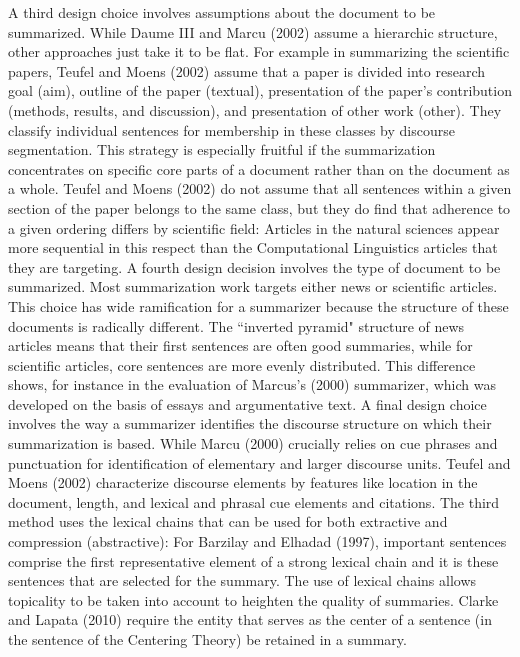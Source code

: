 A third design choice involves assumptions about the document to be summarized.
While  Daume III and Marcu (2002) assume a hierarchic structure, other approaches just take it to be flat. 
For example in summarizing the scientific papers, Teufel and Moens (2002) assume that a paper is divided into research goal (aim), outline of the paper (textual), presentation of the paper's contribution (methods, results, and discussion), and presentation of other work (other). 
They classify individual sentences for membership in these classes by discourse segmentation. 
This strategy is especially fruitful if the summarization concentrates on specific core parts of a document rather than on the document as a whole. 
Teufel and Moens (2002) do not assume that all sentences within a given section of the paper belongs to the same class, but they do find that adherence to a given ordering differs by scientific field: Articles in the natural sciences appear more sequential in this respect than the Computational Linguistics articles that they are targeting. 
A fourth design decision involves the type of document to be summarized.
Most summarization work targets either news or scientific articles. 
This choice has wide ramification for a summarizer because the structure of these documents is radically different. 
The ``inverted pyramid" structure of news articles means that their first sentences are often good summaries, while for scientific articles, core sentences are more evenly distributed. 
This difference shows, for instance in the evaluation of Marcus's (2000) summarizer, which was developed on the basis of essays and argumentative text.
A final design choice involves the way a summarizer identifies the discourse structure on which their summarization is based. 
While Marcu (2000) crucially relies on cue phrases and punctuation for identification of elementary and larger discourse units. 
Teufel and Moens (2002) characterize discourse elements by features like location in the document, length, and lexical and phrasal cue elements and citations. 
The third method uses the lexical chains that can be used for both extractive and compression (abstractive): For Barzilay and Elhadad (1997), important sentences comprise the first representative element of a strong lexical chain and it is these sentences that are selected for the summary. 
The use of lexical chains allows topicality to be taken into account to heighten the quality of summaries. 
Clarke and Lapata (2010) require the entity that serves as the center of a sentence (in the sentence of the Centering Theory) be retained in a summary. 
